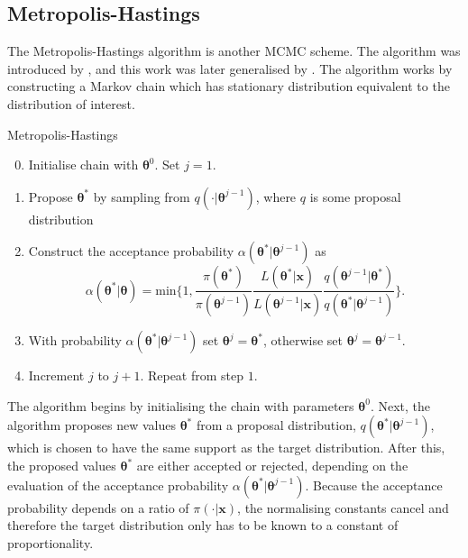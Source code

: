\subsection{Metropolis-Hastings}
\label{sssec:metropolis_hastings}
The Metropolis-Hastings algorithm is another MCMC scheme. The algorithm was introduced by \cite{metropolis53}, and this work was later generalised by \cite{hastings70}. The algorithm works by constructing a Markov chain which has stationary distribution equivalent to the distribution of interest.
\begin{algorithm}
\caption{Metropolis-Hastings}
\label{alg:metropolis_hastings}
\begin{enumerate}
    \setcounter{enumi}{-1}
    \item Initialise chain with $\bm{\theta}^{0}$. Set $j=1$.
    \item Propose ${\bm{\theta}}^*$ by sampling from $q(\cdot|{\bm{\theta}}^{j-1})$, where $q$ is some proposal distribution
    \item Construct the acceptance probability $\alpha({\bm{\theta}}^*|{\bm{\theta}^{j-1}})$ as
    \begin{equation*}
		\alpha({\bm{\theta}}^*|\bm{\theta}) = \text{min}\bigg\{ 1, \frac{\pi({\bm{\theta}}^*)}{\pi({\bm{\theta}}^{j-1})} \frac{L(\bm{\theta}^*|\bm{x})}{L({\bm{\theta}}^{j-1}|\bm{x})} \frac{q({\bm{\theta}}^{j-1}|{\bm{\theta}}^*)}{q({\bm{\theta}}^*|{\bm{\theta}}^{j-1})} \bigg\}.
    \end{equation*}
    \item With probability $\alpha({\bm{\theta}}^*|{\bm{\theta}^{j-1}})$ set ${\bm{\theta}}^j = {\bm{\theta}}^*$, otherwise set ${\bm{\theta}}^j = {\bm{\theta}}^{j-1}$.
    \item Increment $j$ to $j+1$. Repeat from step $1$.
\end{enumerate}
\end{algorithm}

The algorithm begins by initialising the chain with parameters $\bm{\theta}^{0}$. Next, the algorithm proposes new values ${\bm{\theta}}^*$ from a proposal distribution, $q(\bm{\theta}^*|{\bm{\theta}}^{j-1})$, which is chosen to have the same support as the target distribution. After this, the proposed values ${\bm{\theta}}^*$ are either accepted or rejected, depending on the evaluation of the acceptance probability $\alpha({\bm{\theta}}^*|{\bm{\theta}^{j-1}})$. Because the acceptance probability depends on a ratio of $\pi(\cdot|\bm{x})$, the normalising constants cancel and therefore the target distribution only has to be known to a constant of proportionality.

